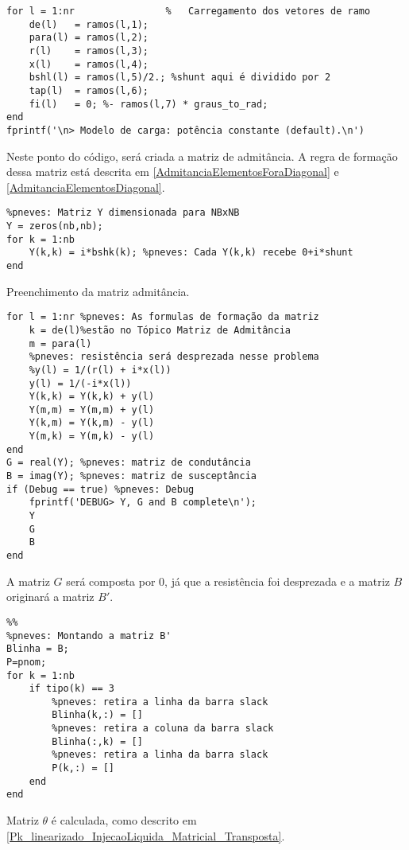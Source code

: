 \begin{verbatim}
for l = 1:nr                %	Carregamento dos vetores de ramo
	de(l)   = ramos(l,1);
	para(l) = ramos(l,2);
	r(l)    = ramos(l,3);
	x(l)    = ramos(l,4);
	bshl(l) = ramos(l,5)/2.; %shunt aqui é dividido por 2
	tap(l)  = ramos(l,6);
	fi(l)   = 0; %- ramos(l,7) * graus_to_rad;
end
fprintf('\n> Modelo de carga: potência constante (default).\n')
\end{verbatim}
Neste ponto do código, será criada a matriz de admitância. A regra de formação dessa matriz está descrita em \ref{AdmitanciaElementosForaDiagonal} e \ref{AdmitanciaElementosDiagonal}. 
\begin{verbatim}
%pneves: Matriz Y dimensionada para NBxNB
Y = zeros(nb,nb);
for k = 1:nb
    Y(k,k) = i*bshk(k); %pneves: Cada Y(k,k) recebe 0+i*shunt
end
\end{verbatim}
Preenchimento da matriz admitância.
\begin{verbatim}
for l = 1:nr %pneves: As formulas de formação da matriz
    k = de(l)%estão no Tópico Matriz de Admitância  
    m = para(l)
    %pneves: resistência será desprezada nesse problema
    %y(l) = 1/(r(l) + i*x(l)) 
    y(l) = 1/(-i*x(l)) 
    Y(k,k) = Y(k,k) + y(l)
    Y(m,m) = Y(m,m) + y(l)
    Y(k,m) = Y(k,m) - y(l)
    Y(m,k) = Y(m,k) - y(l)
end
G = real(Y); %pneves: matriz de condutância
B = imag(Y); %pneves: matriz de susceptância
if (Debug == true) %pneves: Debug
    fprintf('DEBUG> Y, G and B complete\n');
    Y
    G
    B
end
\end{verbatim}
A matriz $G$ será composta por 0, já que a resistência foi desprezada e a matriz $B$ originará a matriz $B'$.
\begin{verbatim}
%%
%pneves: Montando a matriz B'
Blinha = B;
P=pnom;
for k = 1:nb
    if tipo(k) == 3
        %pneves: retira a linha da barra slack
        Blinha(k,:) = []
        %pneves: retira a coluna da barra slack
        Blinha(:,k) = []
        %pneves: retira a linha da barra slack
        P(k,:) = []
    end
end
\end{verbatim}
Matriz $\theta$ é calculada, como descrito em \ref{Pk_linearizado_InjecaoLiquida_Matricial_Transposta}. 
